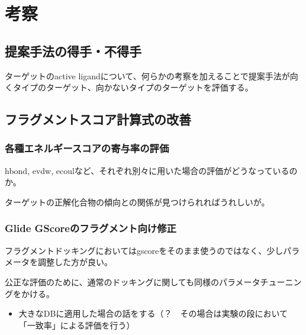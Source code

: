 \chapter{考察}

\section{提案手法の得手・不得手}
ターゲットのactive ligandについて、何らかの考察を加えることで提案手法が向くタイプのターゲット、向かないタイプのターゲットを評価する。

\section{フラグメントスコア計算式の改善}
\subsection{各種エネルギースコアの寄与率の評価}
hbond, evdw, ecoulなど、それぞれ別々に用いた場合の評価がどうなっているのか。

ターゲットの正解化合物の傾向との関係が見つけられればうれしいが。
\subsection{Glide GScoreのフラグメント向け修正}
フラグメントドッキングにおいてはgscoreをそのまま使うのではなく、少しパラメータを調整した方が良い。

公正な評価のために、通常のドッキングに関しても同様のパラメータチューニングをかける。

\begin{itemize}
\item 大きなDBに適用した場合の話をする（？　その場合は実験の段において「一致率」による評価を行う）
\end{itemize}
